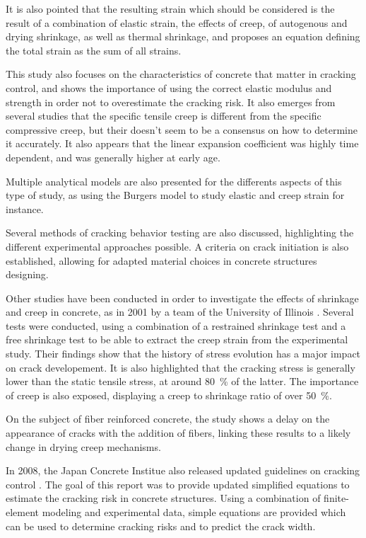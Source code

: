 \documentclass{report}
\begin{document}
It is also pointed that the resulting strain which should be considered is the
result of a combination of elastic strain, the effects of creep, of autogenous
and drying shrinkage, as well as thermal shrinkage, and proposes an equation
defining the total strain as the sum of all strains.

This study also focuses on the characteristics of concrete that matter in
cracking control, and shows the importance of using the correct elastic modulus
and strength in order not to overestimate the cracking risk. It also emerges
from several studies that the specific tensile creep is different from the
specific compressive creep, but their doesn't seem to be a consensus on how to
determine it accurately. It also appears that the linear expansion coefficient
was highly time dependent, and was generally higher at early age.

Multiple analytical models are also presented for the differents aspects of
this type of study, as using the Burgers model to study elastic and creep
strain for instance.

Several methods of cracking behavior testing are also discussed, highlighting
the different experimental approaches possible. A criteria on crack initiation
is also established, allowing for adapted material choices in concrete
structures designing.

Other studies have been conducted in order to investigate the effects of
shrinkage and creep in concrete, as in 2001 by a team of the University of
Illinois \cite{cscea}. Several tests were conducted, using a combination of a
restrained shrinkage test and a free shrinkage test to be able to extract the
creep strain from the experimental study. Their findings show that the history
of stress evolution has a major impact on crack developement. It is also
highlighted that the cracking stress is generally lower than the static tensile
stress, at around \SI{80}{\percent} of the latter. The importance of creep is
also exposed, displaying a creep to shrinkage ratio of over \SI{50}{\percent}.

On the subject of fiber reinforced concrete, the study shows a delay on the
appearance of cracks with the addition of fibers, linking these results to a
likely change in drying creep mechanisms.

In 2008, the Japan Concrete Institue also released updated guidelines on
cracking control \cite{jci}. The goal of this report was to provide updated
simplified equations to estimate the cracking risk in concrete structures.
Using a combination of finite-element modeling and experimental data, simple
equations are provided which can be used to determine cracking risks and to
predict the crack width.
\end{document}
